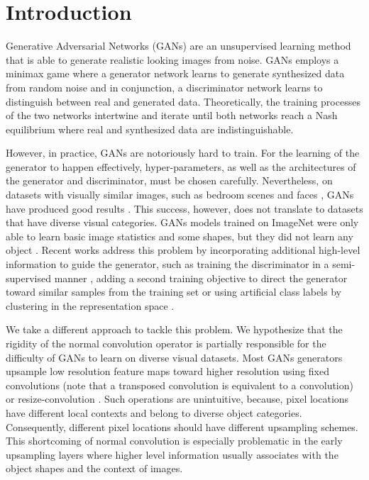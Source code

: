 \documentclass{article} %
\begin{document}
\section{Introduction}
\label{intro}
Generative Adversarial Networks \citep{goodfellow2014generative} (GANs) are an unsupervised learning method that is able to generate realistic looking images from noise. GANs employs a minimax game where a generator network learns to generate synthesized data from random noise and in conjunction, a discriminator network learns to distinguish between real and generated data. Theoretically, the training processes of the two networks intertwine and iterate until both networks reach a Nash equilibrium where real and synthesized data are indistinguishable. \par
However, in practice, GANs are notoriously hard to train. For the learning of the generator to happen effectively, hyper-parameters, as well as the architectures of the generator and discriminator, must be chosen carefully. Nevertheless, on datasets with visually similar images, such as bedroom scenes \citep{yu2015lsun} and faces \citep{chen2016infogan}, GANs have produced good results \citep{radford2015unsupervised}. This success, however, does not translate to datasets that have diverse visual categories. GANs models trained on ImageNet \citep{russakovsky2015imagenet} were only able to learn basic image statistics and some shapes, but they did not learn any object \citep{salimans2016improved}. Recent works address this problem by incorporating additional high-level information to guide the generator, such as training the discriminator in a semi-supervised manner \citep{salimans2016improved}, adding a second training objective to direct the generator toward similar samples from the training set \citep{warde2016improving} or using artificial class labels by clustering in the representation space \citep{1709.07359}. \par
We take a different approach to tackle this problem. We hypothesize that the rigidity of the normal convolution operator is partially responsible for the difficulty of GANs to learn on diverse visual datasets. Most GANs generators upsample low resolution feature maps toward higher resolution using fixed convolutions (note that a transposed convolution is equivalent to a convolution) or resize-convolution \citep{odena2016deconvolution}. Such operations are unintuitive, because, pixel locations have different local contexts and belong to diverse object categories. Consequently, different pixel locations should have different upsampling schemes. This shortcoming of normal convolution is especially problematic in the early upsampling layers where higher level information usually associates with the object shapes and the context of images. \par
\end{document}
